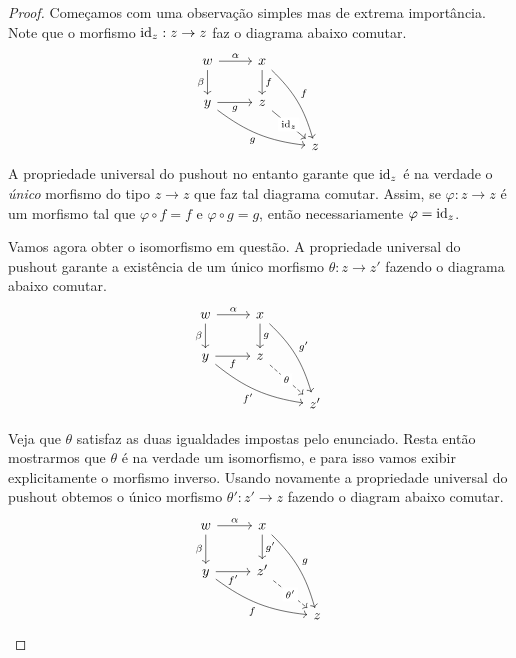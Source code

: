 \begin{proof}
    Começamos com uma observação simples mas de extrema importância.
    Note que o morfismo $\mathrm{id}_z: z \to z$ faz o diagrama abaixo comutar.
    \begin{displaymath}
        \begin{tikzcd}
            w
            \arrow[r, "\alpha"]
            \arrow[d, "\beta" swap]
            & x
            \arrow[d, "f"]
            \arrow[rdd, bend left=15, "f"]
            \\ y
            \arrow[r, "g" swap]
            \arrow[rrd, bend right=15, "g" swap]
            & z
            \arrow[rd, "\id_z" description]
            \\ & & z
        \end{tikzcd}
    \end{displaymath}
    A propriedade universal do pushout no entanto garante que $\mathrm{id}_z$ é na verdade o \emph{único} morfismo do tipo $z \to z$ que faz tal diagrama comutar.
    Assim, se $\varphi: z \to z$ é um morfismo tal que $\varphi \circ f = f$ e $\varphi \circ g = g$, então necessariamente $\varphi = \mathrm{id}_z$.

    Vamos agora obter o isomorfismo em questão.
    A propriedade universal do pushout garante a existência de um único morfismo $\theta: z \to z'$ fazendo o diagrama abaixo comutar.
    \begin{displaymath}
        \begin{tikzcd}
            w
            \arrow[r, "\alpha"]
            \arrow[d, "\beta" swap]
            & x
            \arrow[d, "g"]
            \arrow[rdd, bend left=15, "g'"]
            \\ y
            \arrow[r, "f" swap]
            \arrow[rrd, bend right=15, "f'" swap]
            & z
            \arrow[rd, dashed, "\theta" description]
            \\ & & z'
        \end{tikzcd}
    \end{displaymath}
    
    Veja que $\theta$ satisfaz as duas igualdades impostas pelo enunciado.
    Resta então mostrarmos que $\theta$ é na verdade um isomorfismo, e para isso vamos exibir explicitamente o morfismo inverso.
    Usando novamente a propriedade universal do pushout obtemos o único morfismo $\theta': z' \to z$ fazendo o diagram abaixo comutar.
    \begin{displaymath}
        \begin{tikzcd}
            w
            \arrow[r, "\alpha"]
            \arrow[d, "\beta" swap]
            & x
            \arrow[d, "g'"]
            \arrow[rdd, bend left=15, "g"]
            \\ y
            \arrow[r, "f'" swap]
            \arrow[rrd, bend right=15, "f" swap]
            & z'
            \arrow[rd, dashed, "\theta'" description]
            \\ & & z
        \end{tikzcd}
    \end{displaymath}


\end{proof}
